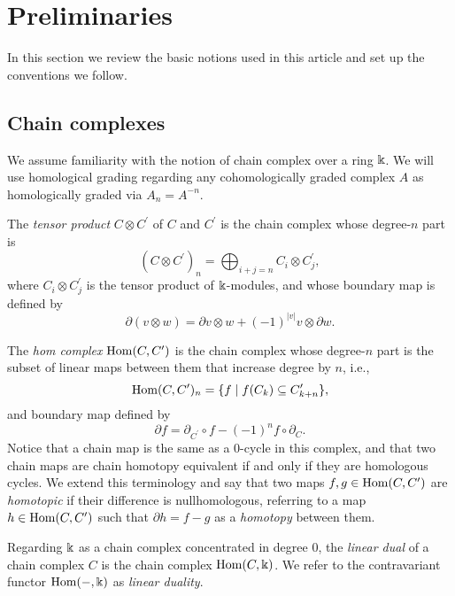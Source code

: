 
\section{Preliminaries} \label{s:preliminaries}

In this section we review the basic notions used in this article and set up the conventions we follow.

\subsection{Chain complexes}

We assume familiarity with the notion of chain complex over a ring $\Bbbk$. We will use homological grading regarding any cohomologically graded complex $A$ as homologically graded via $A_n = A^{-n}$.

The \textit{tensor product} $C \otimes C^\prime$ of $C$ and $C^\prime$ is the chain complex whose degree-$n$ part is
\begin{equation*}
\left(C \otimes C^\prime\right)_n = \bigoplus_{i+j=n} C_i \otimes C^\prime_j,
\end{equation*}
where $C_i \otimes C^\prime_j$ is the tensor product of $\Bbbk$-modules, and whose boundary map is defined by
\begin{equation*}
\partial (v \otimes w) = \partial v \otimes w + (-1)^{|v|} v \otimes \partial w.
\end{equation*}

The \textit{hom complex} $\mathrm{Hom}(C, C^\prime)$ is the chain complex whose degree-$n$ part is the subset of linear maps between them that increase degree by $n$, i.e.,
\begin{equation*}
\mathrm{Hom}(C, C^\prime)_n = \{f \mid f(C_k) \subseteq C^\prime_{k+n}\},
\end{equation*}
and boundary map defined by
\begin{equation*}
\partial f = \partial_{C^\prime} \circ f - (-1)^{n} f \circ \partial_C.
\end{equation*} 
Notice that a chain map is the same as a $0$-cycle in this complex, and that two chain maps are chain homotopy equivalent if and only if they are homologous cycles. We extend this terminology and say that two maps $f, g \in \mathrm{Hom}(C, C^\prime)$ are \textit{homotopic} if their difference is nullhomologous, referring to a map $h \in \mathrm{Hom}(C, C^\prime)$ such that $\partial h = f - g$ as a \textit{homotopy} between them.

Regarding $\Bbbk$ as a chain complex concentrated in degree $0$, the \textit{linear dual} of a chain complex $C$ is the chain complex $\mathrm{Hom}(C, \Bbbk)$.
We refer to the contravariant functor $\mathrm{Hom}(-, \Bbbk)$ as \textit{linear duality}.

